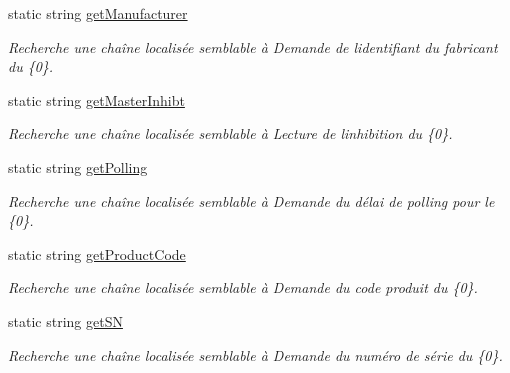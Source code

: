 \begin{DoxyCompactItemize}
static string \mbox{\hyperlink{class_device_library_1_1messages_text_a98d96d1497375fafe0595cd8b05cfd35}{get\+Manufacturer}}
\begin{DoxyCompactList}\small\item\em Recherche une chaîne localisée semblable à Demande de l\textquotesingle{}identifiant du fabricant du \{0\}. \end{DoxyCompactList}\item 
static string \mbox{\hyperlink{class_device_library_1_1messages_text_ab90f77c2226516821994a2f6c1618ba9}{get\+Master\+Inhibt}}
\begin{DoxyCompactList}\small\item\em Recherche une chaîne localisée semblable à Lecture de l\textquotesingle{}inhibition du \{0\}. \end{DoxyCompactList}\item 
static string \mbox{\hyperlink{class_device_library_1_1messages_text_ad09a1b8efb45bbb4d1f9724decdb84d9}{get\+Polling}}
\begin{DoxyCompactList}\small\item\em Recherche une chaîne localisée semblable à Demande du délai de polling pour le \{0\}. \end{DoxyCompactList}\item 
static string \mbox{\hyperlink{class_device_library_1_1messages_text_a38c36d19079298c6c9dbd63befe471bc}{get\+Product\+Code}}
\begin{DoxyCompactList}\small\item\em Recherche une chaîne localisée semblable à Demande du code produit du \{0\}. \end{DoxyCompactList}\item 
static string \mbox{\hyperlink{class_device_library_1_1messages_text_adf25abdc6ae9b774a1acf5ca9c3e774c}{get\+SN}}
\begin{DoxyCompactList}\small\item\em Recherche une chaîne localisée semblable à Demande du numéro de série du \{0\}. \end{DoxyCompactList}\item 

\end{DoxyCompactItemize}
